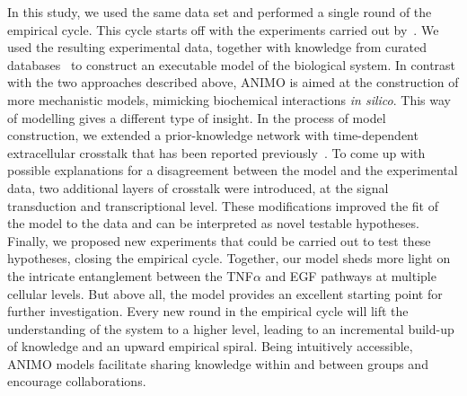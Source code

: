 \documentclass{bmcart}
\begin{document}
In this study, we used the same data set and performed a single round of the empirical cycle. This cycle starts off with the experiments carried out by~\cite{pathway-compendium}. We used the resulting experimental data, together with knowledge from curated databases~\cite{kegg,phosphosite} to construct an executable model of the biological system.
In contrast with the two approaches described above, ANIMO is aimed at the construction of
more mechanistic models, mimicking biochemical interactions \emph{in silico}. This way of modelling
gives a different type of insight. In the process of model construction, we extended a
prior-knowledge network with time-dependent extracellular crosstalk that has been reported
previously~\cite{pathway-autocrine}. To come up with possible explanations for a disagreement
between the model and the experimental data, two additional layers of
crosstalk were introduced, at the signal transduction and transcriptional level. These modifications 
improved the fit of the model to the data and can be interpreted as novel testable hypotheses.
Finally, we proposed new experiments that could be carried out to test these hypotheses, closing the empirical cycle. 
Together, our model sheds more light on the intricate
entanglement between the TNF$\alpha$ and EGF pathways at multiple cellular levels.
But above all,  the model provides an excellent starting point for further investigation.
Every new round in the empirical cycle will lift the understanding of the system to a higher level, leading to an incremental build-up of knowledge and an upward empirical spiral. Being intuitively accessible, ANIMO models facilitate sharing knowledge within and between groups and encourage collaborations.



\end{document}
